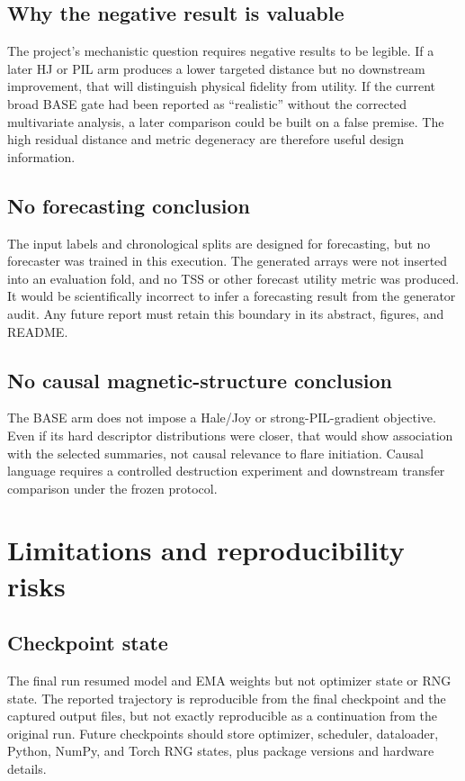 \documentclass[11pt,oneside]{report}
\begin{document}
\section{Why the negative result is valuable}

The project’s mechanistic question requires negative results to be legible. If a later HJ or PIL arm produces a lower targeted distance but no downstream improvement, that will distinguish physical fidelity from utility. If the current broad BASE gate had been reported as ``realistic'' without the corrected multivariate analysis, a later comparison could be built on a false premise. The high residual distance and metric degeneracy are therefore useful design information.

\section{No forecasting conclusion}

The input labels and chronological splits are designed for forecasting, but no forecaster was trained in this execution. The generated arrays were not inserted into an evaluation fold, and no TSS or other forecast utility metric was produced. It would be scientifically incorrect to infer a forecasting result from the generator audit. Any future report must retain this boundary in its abstract, figures, and README.

\section{No causal magnetic-structure conclusion}

The BASE arm does not impose a Hale/Joy or strong-PIL-gradient objective. Even if its hard descriptor distributions were closer, that would show association with the selected summaries, not causal relevance to flare initiation. Causal language requires a controlled destruction experiment and downstream transfer comparison under the frozen protocol.

\chapter{Limitations and reproducibility risks}

\section{Checkpoint state}

The final run resumed model and EMA weights but not optimizer state or RNG state. The reported trajectory is reproducible from the final checkpoint and the captured output files, but not exactly reproducible as a continuation from the original run. Future checkpoints should store optimizer, scheduler, dataloader, Python, NumPy, and Torch RNG states, plus package versions and hardware details.
\end{document}
